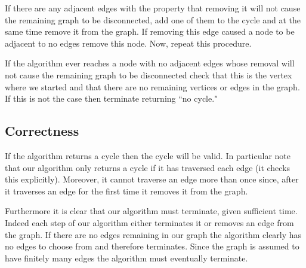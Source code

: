 \documentclass{article}
\begin{document}
If there are any adjacent edges with the property that removing it will not cause the remaining graph to be disconnected, add one of them to the cycle and at the same time remove it from the graph. If removing this edge caused a node to be adjacent to no edges remove this node. Now, repeat this procedure.

If the algorithm ever reaches a node with no adjacent edges whose removal will not cause the remaining graph to be disconnected check that this is the vertex where we started and that there are no remaining vertices or edges in the graph. If this is not the case then terminate returning ``no cycle." 


\subsection{Correctness}
If the algorithm returns a cycle then the cycle will be valid. In particular note that our algorithm only returns a cycle if it has traversed each edge (it checks this explicitly). Moreover, it cannot traverse an edge more than once since, after it traverses an edge for the first time it removes it from the graph.

Furthermore it is clear that our algorithm must terminate, given sufficient time. Indeed each step of our algorithm either terminates it or removes an edge from the graph. If there are no edges remaining in our graph the algorithm clearly has no edges to choose from and therefore terminates. Since the graph is assumed to have finitely many edges the algorithm must eventually terminate.
\end{document}
